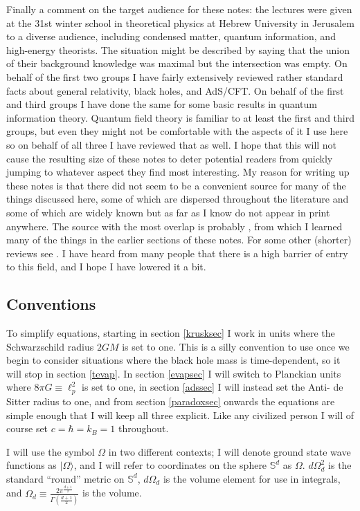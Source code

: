 \documentclass[12pt]{article}
\newcommand{\ran}{\rangle}
\begin{document}
Finally a comment on the target audience for these notes: the lectures were given at the 31st winter school in theoretical physics at Hebrew University in Jerusalem to a diverse audience, including condensed matter, quantum information, and high-energy theorists.  The situation might be described by saying that the union of their background knowledge was maximal but the intersection was empty.  On behalf of the first two groups I have fairly extensively reviewed rather standard facts about general relativity, black holes, and AdS/CFT.  On behalf of the first and third groups I have done the same for some basic results in quantum information theory.  Quantum field theory is familiar to at least the first and third groups, but even they might not be comfortable with the aspects of it I use here so on behalf of all three I have reviewed that as well.  I hope that this will not cause the resulting size of these notes to deter potential readers from quickly jumping to whatever aspect they find most interesting.  My reason for writing up these notes is that there did not seem to be a convenient source for many of the things discussed here, some of which are dispersed throughout the literature and some of which are widely known but as far as I know do not appear in print anywhere.  The source with the most overlap is probably \cite{Susskind:2005js}, from which I learned many of the things in the earlier sections of these notes.  For some other (shorter) reviews see \cite{Preskill:1992tc,Giddings:1994pj,Mathur:2009hf}.  I have heard from many people that there is a high barrier of entry to this field, and I hope I have lowered it a bit.

\subsection{Conventions}
To simplify equations, starting in section \ref{krusksec} I work in units where the Schwarzschild radius $2GM$ is set to one.  This is a silly convention to use once we begin to consider situations where the black hole mass is time-dependent, so it will stop in section \ref{tevap}.  In section \ref{evapsec} I will switch to Planckian units where $8\pi G\equiv \ell_p^2$ is set to one, in section \ref{adssec} I will instead set the Anti- de Sitter radius to one, and from section \ref{paradoxsec} onwards the equations are simple enough that I will keep all three explicit.  Like any civilized person I will of course set $c=\hbar=k_B=1$ throughout.    

I will use the symbol $\Omega$ in two different contexts; I will denote ground state wave functions as $|\Omega\ran$, and I will refer to coordinates on the sphere $\mathbb{S}^d$ as $\Omega$.  $d\Omega_d^2$ is the standard ``round'' metric on $\mathbb{S}^d$, $d\Omega_d$ is the volume element for use in integrals, and $\Omega_d\equiv \frac{2\pi^{\frac{d+1}{2}}}{\Gamma\left(\frac{d+1}{2}\right)}$ is the volume.
\end{document}
